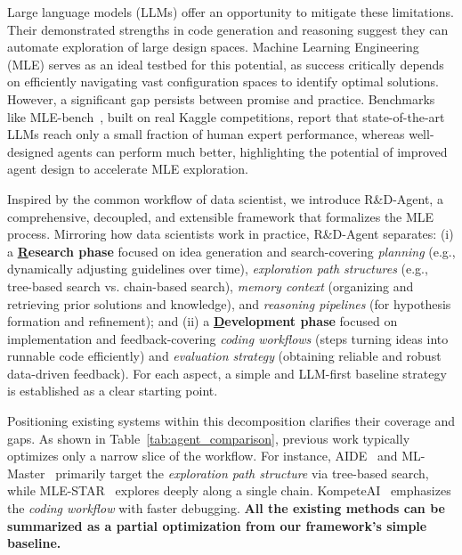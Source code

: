 Large language models (LLMs) offer an opportunity to mitigate these limitations. Their demonstrated strengths in code generation and reasoning\citep{achiam2023gpt,team2023gemini,liu2024deepseek} suggest they can automate exploration of large design spaces.
Machine Learning Engineering (MLE) serves as an ideal testbed for this potential, as success critically depends on efficiently navigating vast configuration spaces to identify optimal solutions. However, a significant gap persists between promise and practice.
Benchmarks like MLE-bench~\citep{chan2024mle-bench}, built on real Kaggle competitions, report that state-of-the-art LLMs reach only a small fraction of human expert performance, whereas well-designed agents can perform much better, highlighting the potential of improved agent design to accelerate MLE exploration.

Inspired by the common workflow of data scientist, we introduce R\&D-Agent, a comprehensive, decoupled, and extensible framework that formalizes the MLE process. Mirroring how data scientists work in practice, R\&D-Agent separates: (i) a \textbf{\uline{R}esearch phase} focused on idea generation and search-covering \textit{planning} (e.g., dynamically adjusting guidelines over time), \textit{exploration path structures} (e.g., tree-based search vs. chain-based search), \textit{memory context} (organizing and retrieving prior solutions and knowledge), and \textit{reasoning pipelines} (for hypothesis formation and refinement); and (ii) a \textbf{\uline{D}evelopment phase} focused on implementation and feedback-covering \textit{coding workflows} (steps turning ideas into runnable code efficiently) and \textit{evaluation strategy} (obtaining reliable and robust data-driven feedback). For each aspect, a simple and LLM-first baseline strategy is established as a clear starting point.

Positioning existing systems within this decomposition clarifies their coverage and gaps. As shown in Table~\ref{tab:agent_comparison}, previous work typically optimizes only a narrow slice of the workflow. For instance, AIDE~\citep{aide2025} and ML-Master~\citep{liu2025ml} primarily target the \textit{exploration path structure} via tree-based search, while MLE-STAR~\citep{nam2025mle} explores deeply along a single chain. KompeteAI~\citep{kulibaba2025kompeteai} emphasizes the \textit{coding workflow} with faster debugging. \textbf{All the existing methods can be summarized as a partial optimization from our framework's simple baseline.}


